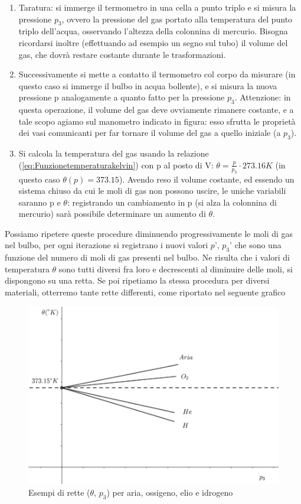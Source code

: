 \documentclass[
10pt, %
a4paper, %
oneside, %
headinclude,footinclude, %
BCOR5mm, %
]{scrartcl}
\begin{document}
\begin{enumerate}
	\item Taratura: si immerge il termometro in una cella a punto triplo e si misura la pressione $p_3$, ovvero la pressione del gas portato alla temperatura del punto triplo dell'acqua, osservando l'altezza della colonnina di mercurio. Bisogna ricordarsi inoltre (effettuando ad esempio un segno sul tubo) il volume del gas, che dovrà restare costante durante le trasformazioni.  
	\item Successivamente si mette a contatto il termometro col corpo da misurare (in questo caso si immerge il bulbo in acqua bollente), e si misura la nuova pressione p analogamente a quanto fatto per la pressione $p_3$. Attenzione: in questa operazione, il volume del gas deve ovviamente rimanere costante, e a tale scopo agiamo sul manometro indicato in figura: esso sfrutta le proprietà dei vasi comunicanti per far tornare il volume del gas a quello iniziale (a $p_3$).
	\item Si calcola la temperatura del gas usando la relazione (\ref{eq:Funzionetemperaturakelvin}) con p al posto di V: $\theta = \frac{p}{p_3} \cdot 273.16 K$ (in questo caso $\theta(p) = 373.15$). Avendo reso il volume costante, ed essendo un sistema chiuso da cui le moli di gas non possono uscire, le uniche variabili saranno p e $\theta$: registrando un cambiamento in p (si alza la colonnina di mercurio) sarà possibile determinare un aumento di $\theta$.
\end{enumerate}
Possiamo ripetere queste procedure diminuendo progressivamente le moli di gas nel bulbo, per ogni iterazione si registrano i nuovi valori $p’$, $p_3’$ che sono una funzione del numero di moli di gas presenti nel bulbo. Ne risulta che i valori di temperatura $\theta$ sono tutti diversi fra loro e decrescenti al diminuire delle moli, si dispongono su una retta. Se poi ripetiamo la stessa procedura per diversi materiali, otterremo tante rette differenti, come riportato nel seguente grafico
\begin{figure}[h!]
	\centering
	\includegraphics[width=0.6\linewidth]{../images/temp_e_puntotriplo}
	\caption{Esempi di rette ($\theta$, $p_3$) per aria, ossigeno, elio e idrogeno}
	\label{fig:tempepuntotriplo}
\end{figure}
\end{document}
